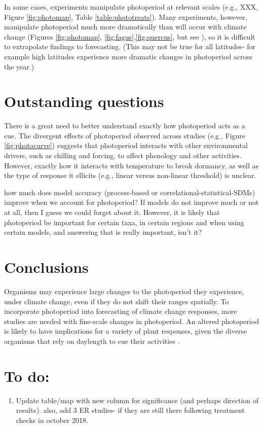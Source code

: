 \documentclass{article}
\begin{document}
\par In some cases, experiments manipulate photoperiod at relevant scales (e.g., XXX, Figure \ref{fig:photomap}, Table \ref{table:phototreats}). Many experiments, however, manipulate photoperiod much more dramatically than will occur with climate change (Figures \ref{fig:photomap}, \ref{fig:fagus},\ref{fig:quercus}, but see \citep{Basler:2012}), so it is difficult to extrapolate findings to forecasting. (This may not be true for all latitudes- for example high latitudes experience more dramatic changes in photoperiod across the year.)

\section* {Outstanding questions}
There is a great need to better understand exactly how photoperiod acts as a cue. The divergent effects of photoperiod observed across studies (e.g., Figure \ref{fig:photocurve}) suggests that photoperiod interacts with other environmental drivers, such as chilling and forcing, to affect phenology and other activities. However, exactly how it interacts with temperature to break dormancy, as well as the type of response it ellicits (e.g., linear versus non-linear threshold) is unclear. 

how much does 
model accuracy (process-based or correlational-statistical-SDMs) improve when we account for photoperiod? If 
models do not improve much or not at all, then I guess we could forget about it. However, it is likely that
photoperiod be important for certain taxa, in certain regions and when using certain models, and answering that
is really important, isn't it?

\section*{Conclusions}
Organisms may experience large changes to the photoperiod they experience, under climate change, even if they do not shift their ranges spatially. To incorporate photoperiod into forecasting of climate change responses, more studies are needed with fine-scale changes in photoperiod. 
An altered photoperiod is likely to have implications for a variety of plant responses, given the diverse organisms that rely on daylength to cue their activities \citep[e.g.,][] {mcallan2006,linn1996,Flynn:2018,solbakken1994}.

\section* {To do:}
\begin{enumerate}
\item Update table/map with new column for significance (and perhaps direction of results). also, add 3 ER studies- if they are still there following treatment checks in october 2018.
\end{enumerate}
\end{document}

